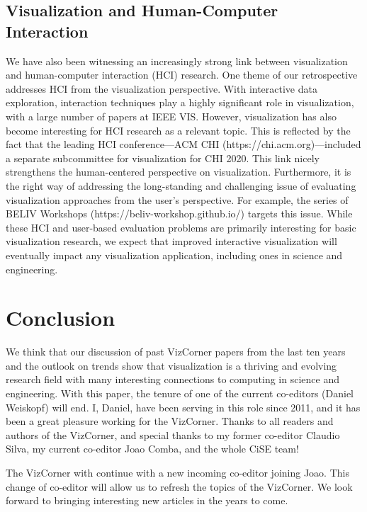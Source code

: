 \documentclass[10pt,journal,compsoc]{IEEEtran}
\begin{document}
{\subsection{Visualization and Human-Computer Interaction}

We have also been witnessing an increasingly strong link between visualization and human-computer interaction (HCI) research. One theme of our retrospective addresses HCI from the visualization perspective. With interactive data exploration, interaction techniques play a highly significant role in visualization, with a large number of papers at IEEE VIS. However, visualization has also become interesting for HCI research as a relevant topic. This is reflected by the fact that the leading HCI conference---ACM CHI (https://chi.acm.org)---included a separate subcommittee for visualization for CHI 2020. This link nicely strengthens the human-centered perspective on visualization.
Furthermore, it is the right way of addressing the long-standing and challenging issue of evaluating visualization approaches from the user's perspective. For example, the series of BELIV Workshops (https://beliv-workshop.github.io/) targets this issue. While these HCI and user-based evaluation problems are primarily interesting for basic visualization research, we expect that improved interactive visualization will eventually impact any visualization application, including ones in science and engineering.


\section{Conclusion}

We think that our discussion of past VizCorner papers from the last ten years and the outlook on trends show that visualization is a thriving and evolving research field with many interesting connections to computing in science and engineering. With this paper, the tenure of one of the current co-editors (Daniel Weiskopf) will end. 
I, Daniel, have been serving in this role since 2011, and it has been a great pleasure working for the VizCorner. Thanks to all readers and authors of the VizCorner, and special thanks to my former co-editor Claudio Silva, my current co-editor Joao Comba, and the whole CiSE team!

The VizCorner with continue with a new incoming co-editor joining Joao. This change of co-editor will allow us to refresh the topics of the VizCorner. We look forward to bringing interesting new articles in the years to come.

}
\end{document}
